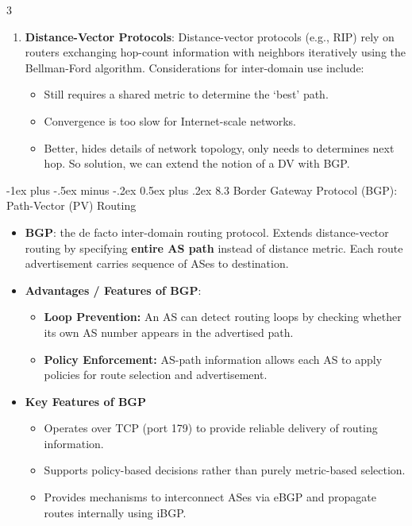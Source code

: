 \documentclass[a4paper, 9pt, landscape]{article}
\makeatletter
\renewcommand{\subsection}{\@startsection{subsubsection}{3}{0mm}%
                                {-1ex plus -.5ex minus -.2ex}%
                                {0.5ex plus .2ex}%
                                {\normalfont\small\bfseries}}
\makeatother
\begin{document}
\begin{multicols*}{3}
\begin{enumerate}
\item \textbf{Distance-Vector Protocols}: Distance-vector protocols (e.g., RIP) rely on routers exchanging hop-count information with neighbors iteratively using the Bellman-Ford algorithm. Considerations for inter-domain use include:
\begin{itemize}
    \item Still requires a shared metric to determine the `best' path.
    \item Convergence is too slow for Internet-scale networks.
    \item Better, hides details of network topology, only needs to determines next hop. So solution, we can extend the notion of a DV with BGP.
\end{itemize}
\end{enumerate}


\subsection{8.3 Border Gateway Protocol (BGP): Path-Vector (PV) Routing}

\begin{itemize}
\item \textbf{BGP}: the de facto inter-domain routing protocol. Extends distance-vector routing by specifying \textbf{entire AS path} instead of distance metric. Each route advertisement carries sequence of ASes to destination. 
\item \textbf{Advantages / Features of BGP}:
	\begin{itemize}
	    \item \textbf{Loop Prevention:} An AS can detect routing loops by checking whether its own AS number appears in the advertised path.
	    \item \textbf{Policy Enforcement:} AS-path information allows each AS to apply policies for route selection and advertisement.
	\end{itemize}
\item \textbf{Key Features of BGP}
	\begin{itemize}
	    \item Operates over TCP (port 179) to provide reliable delivery of routing information.
	    \item Supports policy-based decisions rather than purely metric-based selection.
	    \item Provides mechanisms to interconnect ASes via eBGP and propagate routes internally using iBGP.
	\end{itemize}
\end{itemize}


\end{multicols*}
\end{document}
